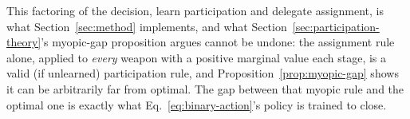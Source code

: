This factoring of the decision, learn participation and delegate assignment,
is what Section~\ref{sec:method} implements, and what
Section~\ref{sec:participation-theory}'s myopic-gap proposition argues cannot be
undone: the assignment rule alone, applied to \emph{every} weapon with a
positive marginal value each stage, is a valid (if unlearned) participation
rule, and
Proposition~\ref{prop:myopic-gap} shows it can be arbitrarily far from
optimal. The gap between that myopic rule and the optimal one is exactly
what Eq.~\eqref{eq:binary-action}'s policy is trained to close.
